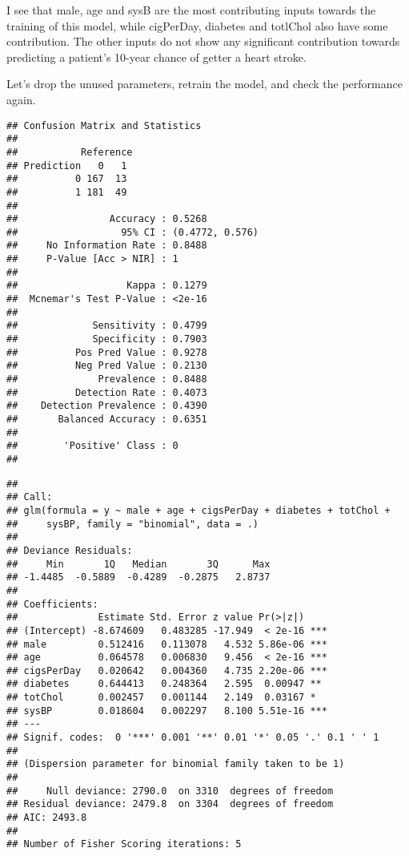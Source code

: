 \documentclass[]{article}
\begin{document}
I see that male, age and sysB are the most contributing inputs towards
the training of this model, while cigPerDay, diabetes and totlChol also
have some contribution. The other inputs do not show any significant
contribution towards predicting a patient's 10-year chance of getter a
heart stroke.

Let's drop the unused parameters, retrain the model, and check the
performance again.

\begin{verbatim}
## Confusion Matrix and Statistics
## 
##           Reference
## Prediction   0   1
##          0 167  13
##          1 181  49
##                                          
##                Accuracy : 0.5268         
##                  95% CI : (0.4772, 0.576)
##     No Information Rate : 0.8488         
##     P-Value [Acc > NIR] : 1              
##                                          
##                   Kappa : 0.1279         
##  Mcnemar's Test P-Value : <2e-16         
##                                          
##             Sensitivity : 0.4799         
##             Specificity : 0.7903         
##          Pos Pred Value : 0.9278         
##          Neg Pred Value : 0.2130         
##              Prevalence : 0.8488         
##          Detection Rate : 0.4073         
##    Detection Prevalence : 0.4390         
##       Balanced Accuracy : 0.6351         
##                                          
##        'Positive' Class : 0              
## 
\end{verbatim}

\begin{verbatim}
## 
## Call:
## glm(formula = y ~ male + age + cigsPerDay + diabetes + totChol + 
##     sysBP, family = "binomial", data = .)
## 
## Deviance Residuals: 
##     Min       1Q   Median       3Q      Max  
## -1.4485  -0.5889  -0.4289  -0.2875   2.8737  
## 
## Coefficients:
##              Estimate Std. Error z value Pr(>|z|)    
## (Intercept) -8.674609   0.483285 -17.949  < 2e-16 ***
## male         0.512416   0.113078   4.532 5.86e-06 ***
## age          0.064578   0.006830   9.456  < 2e-16 ***
## cigsPerDay   0.020642   0.004360   4.735 2.20e-06 ***
## diabetes     0.644413   0.248364   2.595  0.00947 ** 
## totChol      0.002457   0.001144   2.149  0.03167 *  
## sysBP        0.018604   0.002297   8.100 5.51e-16 ***
## ---
## Signif. codes:  0 '***' 0.001 '**' 0.01 '*' 0.05 '.' 0.1 ' ' 1
## 
## (Dispersion parameter for binomial family taken to be 1)
## 
##     Null deviance: 2790.0  on 3310  degrees of freedom
## Residual deviance: 2479.8  on 3304  degrees of freedom
## AIC: 2493.8
## 
## Number of Fisher Scoring iterations: 5
\end{verbatim}
\end{document}
